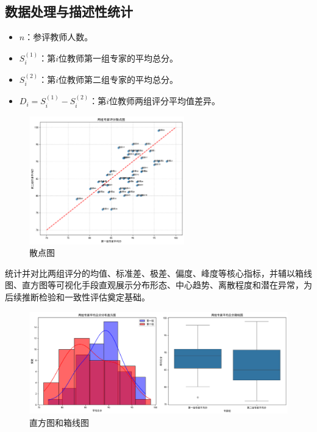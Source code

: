 \subsection{数据处理与描述性统计}


\begin{itemize}
    \item $n$：参评教师人数。
    \item $S^{(1)}_i$：第$i$位教师第一组专家的平均总分。
    \item $S^{(2)}_i$：第$i$位教师第二组专家的平均总分。
    \item $D_i = S^{(1)}_i - S^{(2)}_i$：第$i$位教师两组评分平均值差异。
\end{itemize}

\begin{figure}[htbp]
    \centering
    \includegraphics[width=0.6\textwidth]{scores_scatter.png} %
    \caption{散点图}
\end{figure}


统计并对比两组评分的均值、标准差、极差、偏度、峰度等核心指标，并辅以箱线图、直方图等可视化手段直观展示分布形态、中心趋势、离散程度和潜在异常，为后续推断检验和一致性评估奠定基础。

\begin{figure}[htbp]
    \centering
    \includegraphics[width=1\textwidth]{descriptive_statistics.png} %
    \caption{直方图和箱线图}
\end{figure}



